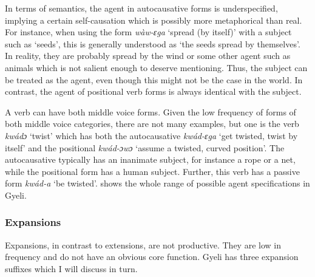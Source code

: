 In terms of semantics, the agent in autocausative forms is underspecified, implying a certain self-causation which is possibly more metaphorical than real. For instance, when using the form {\itshape wàw-ɛga} `spread (by itself)' with a subject such as `seeds', this is generally understood as `the seeds spread by themselves'. In reality, they are probably spread by the wind or some other agent such as animals which is not salient enough to deserve mentioning. Thus, the subject can be treated as the agent, even though this might not be the case in the world. In contrast, the agent of positional verb forms is always identical with the subject.


A verb can have both middle voice forms. Given the low frequency of forms of both middle voice categories, there are not many examples, but one is the verb {\itshape kwádɔ} `twist' which has both the autocausative {\itshape kwád-ɛga} `get twisted, twist by itself' and the positional {\itshape kwád-ɔwɔ} `assume a twisted, curved position'.  The autocausative typically has an inanimate subject, for instance a rope or a net, while the positional form has a human subject. Further, this verb has a passive form {\itshape kwád-a} `be twisted'.  shows the whole range of possible agent specifications in Gyeli.


\begin{table} 
\caption{Scale of decreasing expression of agentivity}
 \label{Tab:VerbScale}
\end{table}



\subsubsection{Expansions}
\label{sec:DiaEx} 

Expansions, in contrast to extensions, are not productive. They are low in frequency and do not have an obvious core function. Gyeli has three expansion suffixes which I will discuss in turn.


